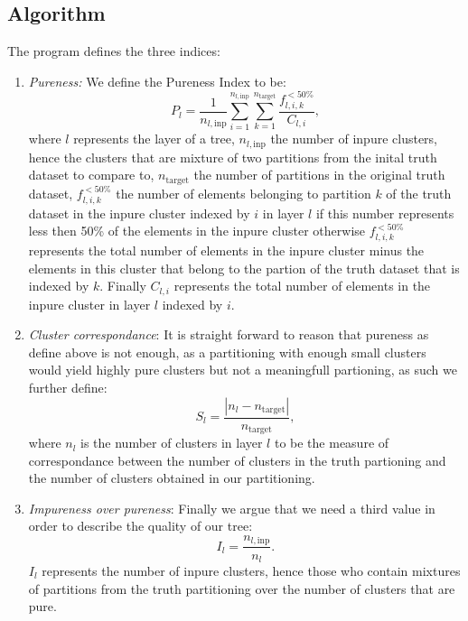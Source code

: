 \subsection{Algorithm}
The program defines the three indices:
\begin{enumerate}
\item \emph{Pureness:} We define the Pureness Index to be:
  \begin{equation}
    P_{l} =
    \frac{1}{n_{l,\mathrm{inp}}}
    \sum_{i=1}^{n_{l,\mathrm{inp}}}\sum_{k=1}^{n_{\mathrm{target}}}
    \frac{f_{l,i,k}^{<50\%}}{C_{l,i}},
    \label{eqn-pureness}
  \end{equation}
  where $l$ represents the layer of a tree, $n_{l,\mathrm{inp}}$ the
  number of inpure clusters, hence the clusters that are mixture of
  two partitions from the inital truth dataset to compare to,
  $n_{\mathrm{target}}$ the number of partitions in the original
  truth dataset, $f_{l,i,k}^{<50\%}$ the number of elements
  belonging to partition $k$ of the truth dataset in the inpure
  cluster indexed by $i$ in layer $l$ if this number represents less
  then 50\% of the elements in the inpure cluster otherwise
  $f_{l,i,k}^{<50\%}$ represents the total number of elements in the
  inpure cluster minus the elements in this cluster that belong to
  the partion of the truth dataset that is indexed by $k$. Finally
  $C_{l,i}$ represents the total number of elements in the inpure
  cluster in layer $l$ indexed by $i$.
\item \emph{Cluster correspondance}: It is straight forward to
  reason that pureness as define above is not enough, as a
  partitioning with enough small clusters would yield highly pure
  clusters but not a meaningfull partioning, as such we further
  define:
  \begin{equation}
    S_{l}=\frac{|n_{l}-n_{\mathrm{target}}|}{n_{\mathrm{target}}}, \label{eqn-c-corr}
  \end{equation}
  where $n_{l}$ is the number of clusters in layer $l$ to be the
  measure of correspondance between the number of clusters in the
  truth partioning and the number of clusters obtained in our
  partitioning.
\item \emph{Impureness over pureness}: Finally we argue that we need a
  third value in order to describe the quality of our tree:
  \begin{equation}
    I_{l}=\frac{n_{l,\mathrm{inp}}}{n_{l}}. \label{eqn-impure-pure}
  \end{equation}
  $I_{l}$ represents the number of inpure clusters, hence those who
  contain mixtures of partitions from the truth partitioning over
  the number of clusters that are pure.
\end{enumerate}
